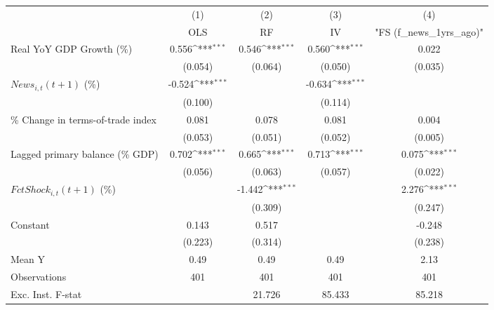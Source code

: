 {
\def\sym#1{\ifmmode^{#1}\else\(^{#1}\)\fi}
\begin{tabular}{l*{4}{c}}
\toprule
                    &\multicolumn{1}{c}{(1)}&\multicolumn{1}{c}{(2)}&\multicolumn{1}{c}{(3)}&\multicolumn{1}{c}{(4)}\\
                    &\multicolumn{1}{c}{OLS}&\multicolumn{1}{c}{RF}&\multicolumn{1}{c}{IV}&\multicolumn{1}{c}{ "FS (f_news_1yrs_ago)" }\\
\midrule
Real YoY GDP Growth (\%)&       0.556\sym{***}&       0.546\sym{***}&       0.560\sym{***}&       0.022         \\
                    &     (0.054)         &     (0.064)         &     (0.050)         &     (0.035)         \\
\addlinespace
$ News_{i,t}(t+1)$ (\%)&      -0.524\sym{***}&                     &      -0.634\sym{***}&                     \\
                    &     (0.100)         &                     &     (0.114)         &                     \\
\addlinespace
\% Change in terms-of-trade index&       0.081         &       0.078         &       0.081         &       0.004         \\
                    &     (0.053)         &     (0.051)         &     (0.052)         &     (0.005)         \\
\addlinespace
Lagged primary balance (\% GDP)&       0.702\sym{***}&       0.665\sym{***}&       0.713\sym{***}&       0.075\sym{***}\\
                    &     (0.056)         &     (0.063)         &     (0.057)         &     (0.022)         \\
\addlinespace
$ FctShock_{i,t}(t+1)$ (\%)&                     &      -1.442\sym{***}&                     &       2.276\sym{***}\\
                    &                     &     (0.309)         &                     &     (0.247)         \\
\addlinespace
Constant            &       0.143         &       0.517         &                     &      -0.248         \\
                    &     (0.223)         &     (0.314)         &                     &     (0.238)         \\
\midrule
Mean Y              &        0.49         &        0.49         &        0.49         &        2.13         \\
Observations        &         401         &         401         &         401         &         401         \\
Exc. Inst. F-stat   &                     &      21.726         &      85.433         &      85.218         \\
\bottomrule
\end{tabular}
}
